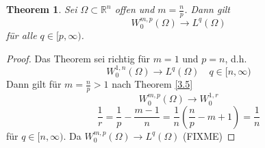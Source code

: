 \documentclass[
paper=a4,
bibtotocnumbered,
liststotocnumbered,
tablecaptionabove,
pointlessnumbers,
twoside,
openright,
10pt
]
{report}
\newtheorem{thm}{Theorem}[chapter]
\theoremstyle{definition}
\numberwithin{equation}{chapter}
\begin{document}
\begin{thm}\label{3.7}
 Sei $\Omega\subset \mathbb R^n$ offen und $m=\frac{n}{p}$. Dann gilt
 \begin{equation}
  W_0^{m,p}(\Omega) \to L^q(\Omega)
 \end{equation}
 für alle $q\in [p,\infty)$.
\end{thm}
\begin{proof}
 Das Theorem sei richtig für $m=1$ und $p=n$, d.h.
 \begin{equation}\label{3.7.1}
  W_0^{1,n}(\Omega) \to L^q(\Omega)\quad q \in [n,\infty)
 \end{equation}
Dann gilt für $m=\frac{n}{p}>1$ nach Theorem \ref{3.5}
\begin{equation}
 W_0^{m,p}(\Omega) \to W_0^{1,r}
\end{equation}
\begin{equation}
 \frac{1}{r} = \frac{1}{p} - \frac{m-1}{n} = \frac{1}{n} \left ( \frac{n}{p} -m+1 \right )= \frac{1}{n}
\end{equation}
für $q\in [n,\infty)$. Da $W_0^{m,p}(\Omega)\to L^q(\Omega)$ (FIXME)


\end{proof}
\end{document}
